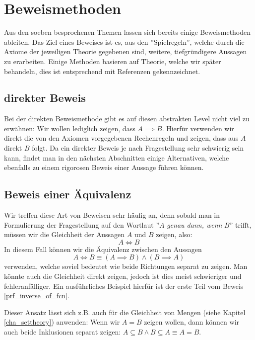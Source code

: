 \section{Beweismethoden}
Aus den soeben besprochenen Themen lassen sich bereits einige Beweismethoden ableiten. Das Ziel eines Beweises ist es, aus den ''Spielregeln'', welche durch die Axiome der jeweiligen Theorie gegebenen sind, weitere, tiefgründigere Aussagen zu erarbeiten. Einige Methoden basieren auf Theorie, welche wir später behandeln, dies ist entsprechend mit Referenzen gekennzeichnet.

\subsection{direkter Beweis}
Bei der direkten Beweismethode gibt es auf diesen abstrakten Level nicht viel zu erwähnen: Wir wollen lediglich zeigen, dass $A \implies B$. Hierfür verwenden wir direkt die von den Axiomen vorgegebenen Rechenregeln und zeigen, dass aus $A$ direkt $B$ folgt. Da ein direkter Beweis je nach Fragestellung sehr schwierig sein kann, findet man in den nächsten Abschnitten einige Alternativen, welche ebenfalls zu einem rigorosen Beweis einer Aussage führen können.

\subsection{Beweis einer Äquivalenz}
Wir treffen diese Art von Beweisen sehr häufig an, denn sobald man in Formulierung der Fragestellung auf den Wortlaut ''$A$ \textit{genau dann, wenn} $B$'' trifft, müssen wir die Gleichheit der Aussagen $A$ und $B$ zeigen, also:
$$A \iff B$$
In diesem Fall können wir die Äquivalenz zwischen den Aussagen
$$A \iff B \equiv (A \implies B) \land (B \implies A)$$ 
verwenden, welche soviel bedeutet wie beide Richtungen separat zu zeigen. Man könnte auch die Gleichheit direkt zeigen, jedoch ist dies meist schwieriger und fehleranfälliger. Ein ausführliches Beispiel hierfür ist der erste Teil vom Beweis \ref{prf_inverse_of_fcn}.

Dieser Ansatz lässt sich z.B. auch für die Gleichheit von Mengen (siehe Kapitel \ref{cha_settheory}) anwenden: Wenn wir $A = B$ zeigen wollen, dann können wir auch beide Inklusionen separat zeigen: $A \subseteq B \land B \subseteq A \equiv A = B$. 

